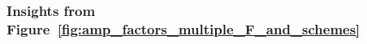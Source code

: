 \documentclass{article}
\begin{document}

			
			\subsubsection{Insights from Figure~\ref{fig:amp_factors_multiple_F_and_schemes}}
				
\end{document}
